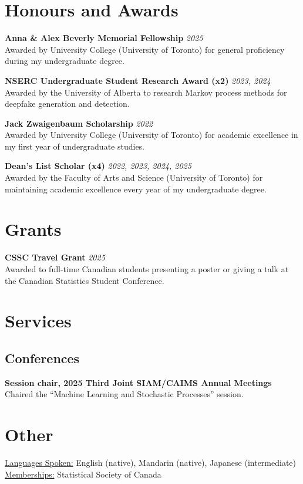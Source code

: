 \documentclass[11pt]{article}
\theoremstyle{definition}
\newcommand{\1}{\mathds 1}
\begin{document}
\section*{Honours and Awards}
\textbf{Anna \& Alex Beverly Memorial Fellowship} \hfill \textit{2025}\\
Awarded by University College (University of Toronto) for general proficiency during my undergraduate degree.

\textbf{NSERC Undergraduate Student Research Award (x2)} \hfill \textit{2023, 2024}\\
Awarded by the University of Alberta to research Markov process methods for deepfake generation and detection. 

\textbf{Jack Zwaigenbaum Scholarship }\hfill \textit{2022}\\
Awarded by University College (University of Toronto) for academic excellence in my first year of undergraduate studies.

\textbf{Dean's List Scholar (x4)} \hfill \textit{2022, 2023, 2024, 2025}\\
Awarded by the Faculty of Arts and Science (University of Toronto) for maintaining academic excellence every year of my undergraduate degree. 

\section*{Grants}
\textbf{CSSC Travel Grant} \hfill \textit{2025}\\
Awarded to full-time Canadian students presenting a poster or giving a talk at the Canadian Statistics Student Conference.




\section*{Services}
\subsection*{Conferences}
\textbf{Session chair, 2025 Third Joint SIAM/CAIMS Annual Meetings}\\
Chaired the ``Machine Learning and Stochastic Processes'' session.


\section*{Other}
\underline{Languages Spoken:} English (native), Mandarin (native), Japanese (intermediate)\\
\underline{Memberships:} Statistical Society of Canada
\end{document}
